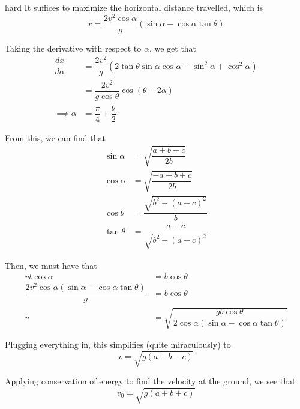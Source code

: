 \begin{solution}{hard}
It suffices to maximize the horizontal distance travelled, which is
$$x=\dfrac{2v^2\cos\alpha}{g}\left(\sin\alpha-\cos\alpha\tan\theta\right)$$

Taking the derivative with respect to $\alpha$, we get that
\begin{align*}
\dfrac{dx}{d\alpha}&=\dfrac{2v^2}{g}\left(2\tan\theta\sin\alpha\cos\alpha-\sin^2\alpha+\cos^2\alpha\right)\\
&=\dfrac{2v^2}{g\cos\theta}\cos\left(\theta-2\alpha\right)\\
\implies\alpha&=\dfrac{\pi}{4}+\dfrac{\theta}{2}
\end{align*}

From this, we can find that
\begin{align*}
\sin\alpha&=\sqrt{\dfrac{a+b-c}{2b}}\\
\cos\alpha&=\sqrt{\dfrac{-a+b+c}{2b}}\\
\cos\theta&=\dfrac{\sqrt{b^2-(a-c)^2}}{b}\\
\tan\theta&=\dfrac{a-c}{\sqrt{b^2-(a-c)^2}}
\end{align*}

Then, we must have that
\begin{align*}
vt\cos\alpha&=b\cos\theta\\
\dfrac{2v^2\cos\alpha\left(\sin\alpha-\cos\alpha\tan\theta\right)}{g}&=b\cos\theta\\
v&=\sqrt{\dfrac{gb\cos\theta}{2\cos\alpha(\sin\alpha-\cos\alpha\tan\theta)}}
\end{align*}

Plugging everything in, this simplifies (quite miraculously) to
$$v=\sqrt{g(a+b-c)}$$

Applying conservation of energy to find the velocity at the ground, we see that
$$\boxed{v_0=\sqrt{g(a+b+c)}}$$
\end{solution}